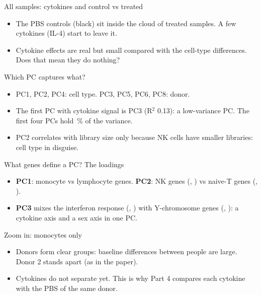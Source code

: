 \begin{frame}{All samples: cytokines and control vs treated}
  \centering
  \begin{itemize}\small\setlength\itemsep{2pt}
    \item The PBS controls (black) sit \alert{inside} the cloud of treated samples. A few cytokines (IL-4) start to leave it.
    \item Cytokine effects are real but \alert{small compared with the cell-type differences}. Does that mean they do nothing?
  \end{itemize}
\end{frame}

\begin{frame}{Which PC captures what?}
  \centering
  \begin{itemize}\small\setlength\itemsep{2pt}
    \item PC1, PC2, PC4: \alert{cell type}. PC3, PC5, PC6, PC8: \alert{donor}.
    \item The first PC with cytokine signal is PC3 (R$^2$ 0.13): a low-variance PC. The first four PCs hold \numpcafirstfour\,\% of the variance.
    \item PC2 correlates with library size only because NK cells have smaller libraries: cell type in disguise.
  \end{itemize}
\end{frame}

\begin{frame}{What genes define a PC? The loadings}
  \centering
  \begin{itemize}\small\setlength\itemsep{2pt}
    \item \textbf{PC1}: monocyte vs lymphocyte genes. \textbf{PC2}: NK genes (, ) vs naive-T genes (, ).
    \item \textbf{PC3} mixes the \alert{interferon response} (, ) with \alert{Y-chromosome genes} (, ): a cytokine axis and a sex axis in one PC.
  \end{itemize}
\end{frame}

\begin{frame}{Zoom in: monocytes only}
  \centering
  \begin{itemize}\small\setlength\itemsep{2pt}
    \item \alert{Donors} form clear groups: baseline differences between people are large. Donor 2 stands apart (as in the paper).
    \item Cytokines do not separate yet. This is why Part 4 compares each cytokine with the PBS of the \alert{same donor}.
  \end{itemize}
\end{frame}

